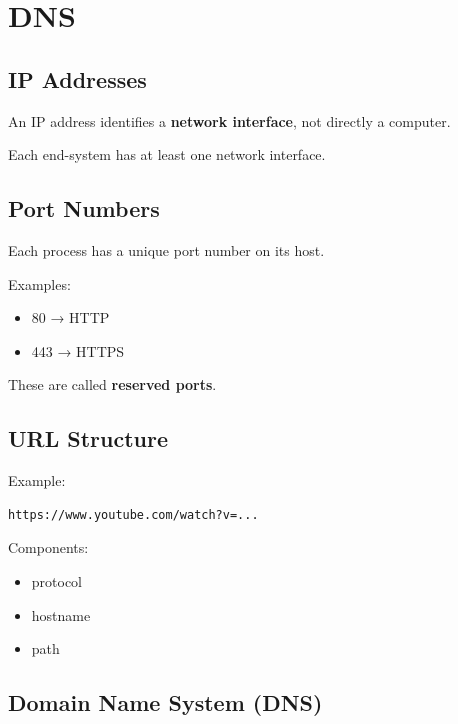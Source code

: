 
\section{DNS}

\subsection{IP Addresses}

An IP address identifies a \textbf{network interface}, not directly a computer.

Each end-system has at least one network interface.

\subsection{Port Numbers}

Each process has a unique port number on its host.

Examples:

\begin{itemize}
\item 80 → HTTP
\item 443 → HTTPS
\end{itemize}

These are called \textbf{reserved ports}.

\subsection{URL Structure}

Example:

\begin{verbatim}
https://www.youtube.com/watch?v=...
\end{verbatim}

Components:

\begin{itemize}
\item protocol
\item hostname
\item path
\end{itemize}

\subsection{Domain Name System (DNS)}

